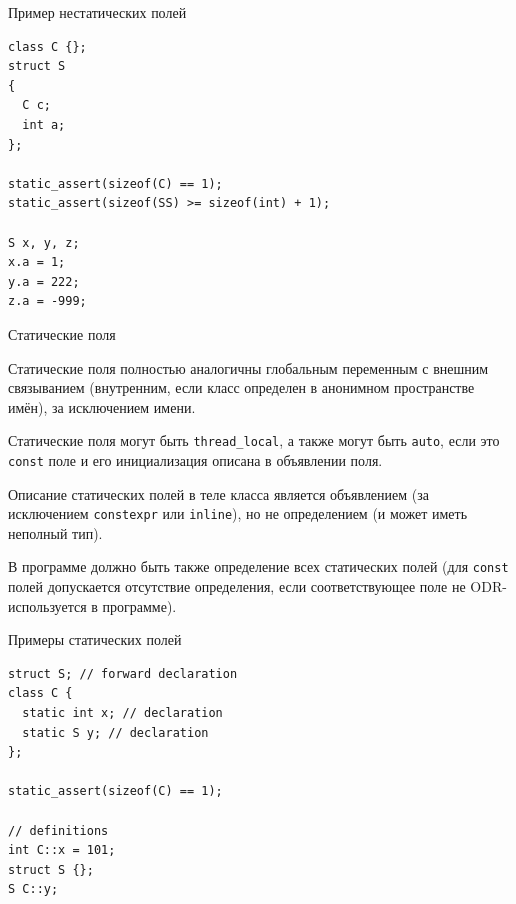 \documentclass[unknownkeysallowed,xcolor=table]{beamer}
\begin{document}
\begin{frame}[fragile]{Пример нестатических полей}

\begin{lstlisting}
class C {};
struct S
{
  C c;
  int a;
};

static_assert(sizeof(C) == 1);
static_assert(sizeof(SS) >= sizeof(int) + 1);

S x, y, z;
x.a = 1;
y.a = 222;
z.a = -999;
\end{lstlisting}

\end{frame}

\begin{frame}{Статические поля}

Статические поля полностью аналогичны глобальным переменным с внешним связыванием (внутренним, если класс определен в анонимном пространстве имён), за исключением имени.

\vspace{1em}

Статические поля могут быть \lstinline{thread_local}, а также могут быть \lstinline{auto}, если это \lstinline{const} поле и его инициализация описана в объявлении поля.

\vspace{1em}

Описание статических полей в теле класса является объявлением (за исключением \lstinline{constexpr} или \lstinline{inline}), но не определением (и может иметь неполный тип).

В программе должно быть также определение всех статических полей (для \lstinline{const} полей допускается отсутствие определения, если соответствующее поле не ODR-используется в программе).

\end{frame}

\begin{frame}[fragile]{Примеры статических полей}

\begin{lstlisting}
struct S; // forward declaration
class C {
  static int x; // declaration
  static S y; // declaration
};

static_assert(sizeof(C) == 1);

// definitions
int C::x = 101;
struct S {};
S C::y;
\end{lstlisting}

\end{frame}
\end{document}

